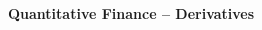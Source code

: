 \documentclass[10pt,landscape]{article}
\begin{document}
\newpage
\begin{multicols}{2}
\setlength{\premulticols}{1pt}
\setlength{\postmulticols}{1pt}
\setlength{\multicolsep}{1pt}
\setlength{\columnsep}{2pt}


\end{multicols}










































\newpage



\begin{center}
     \Large{\textbf{Quantitative Finance -- Derivatives}} \\
\end{center}
\end{document}
